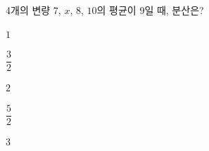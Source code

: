 4개의 변량 $7$, $x$, $8$, $10$의 평균이 9일 때, 분산은?
\begin{choices32}{\rule[-3ex]{0pt}{8ex}$1$}{\rule[-3ex]{0pt}{8ex}$\dfrac{3}{2}$}{\rule[-3ex]{0pt}{8ex}$2$}{\rule[-3ex]{0pt}{8ex}$\dfrac{5}{2}$}{\rule[-3ex]{0pt}{8ex}$3$}\end{choices32}
